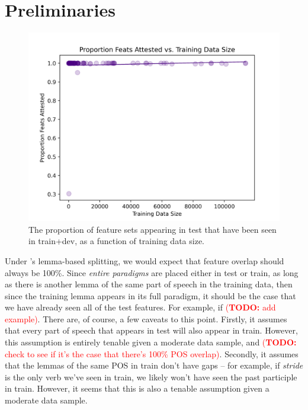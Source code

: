 \documentclass[11pt]{article}
\newcommand{\todo}[1]{\textcolor{red}{(\textbf{TODO:} #1)}}
\begin{document}
\section{Preliminaries}
\begin{figure}
\centering
\includegraphics[width=\linewidth]{figs/feats_attested.png}
\caption{The proportion of feature sets appearing in test that have been seen in train+dev, as a function of training data size.}
\label{feats_attested}
\end{figure}

Under \citeauthor{goldman-etal-2022-un}'s lemma-based splitting, we would expect that feature overlap should always be 100\%. 
Since \textit{entire paradigms} are placed either in test or train, as long as there is another lemma of the same part of speech in the training data, then since the training lemma appears in its full paradigm, it should be the case that we have already seen all of the test features. 
For example, if \todo{add example}.
There are, of course, a few caveats to this point. 
Firstly, it assumes that every part of speech that appears in test will also appear in train. However, this assumption is entirely tenable given a moderate data sample, and \todo{check to see if it's the case that there's 100\% POS overlap}. 
Secondly, it assumes that the lemmas of the same POS in train don't have gaps -- for example, if \textit{stride} is the only verb we've seen in train, we likely won't have seen the past participle in train. 
However, it seems that this is also a tenable assumption given a moderate data sample. 
\end{document}
